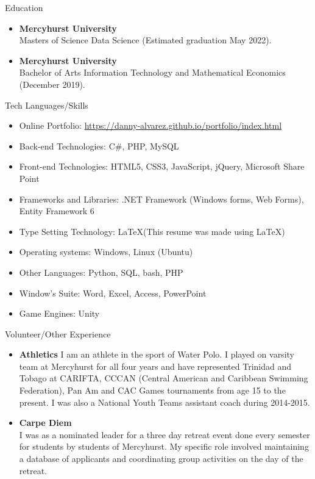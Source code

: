 \documentclass[11pt]{resume} %
\newcommand{\bold}[1]{\textbf{#1}}
\begin{document}
\begin{rSection}{Education}

\begin{itemize}
	\item\bold{Mercyhurst University}\\
	Masters of Science Data Science  (Estimated graduation May 2022).
	
	\item\bold{Mercyhurst University}\\
	Bachelor of Arts Information Technology and Mathematical Economics (December 2019).

\end{itemize}
\end{rSection}
\vspace{1in}
\begin{rSection}{Tech Languages/Skills}
\begin{itemize}
\item Online Portfolio: \url{https://danny-alvarez.github.io/portfolio/index.html}
\item Back-end Technologies: C\#, PHP, MySQL
\item Front-end Technologies: HTML5, CSS3, JavaScript, jQuery, Microsoft Share Point
\item Frameworks and Libraries: .NET Framework (Windows forms, Web Forms), Entity Framework 6
\item Type Setting Technology: \LaTeX\xspace (This resume was made using \LaTeX)
\item Operating systems: Windows, Linux (Ubuntu)
\item Other Languages: Python, SQL, bash, PHP
\item Window's Suite: Word, Excel, Access, PowerPoint
\item Game Engines: Unity
\end{itemize}
\end{rSection}



\begin{rSection}{Volunteer/Other Experience}
	\begin{itemize}
		\item\bold{Athletics}
		I am an athlete in the sport of Water Polo. I played on varsity team at Mercyhurst for all four years and have represented Trinidad and Tobago at CARIFTA, CCCAN (Central American and Caribbean Swimming Federation), Pan Am and CAC Games tournaments from age 15 to the present. I was also a National Youth Teams assistant coach during 2014-2015. 
		\item\bold{Carpe Diem}\\
		I was as a nominated leader for a three day retreat event done every semester for students by students of Mercyhurst. My specific role involved maintaining a database of applicants and coordinating group activities on the day of the retreat. 
	\end{itemize}
\end{rSection}
\end{document}
